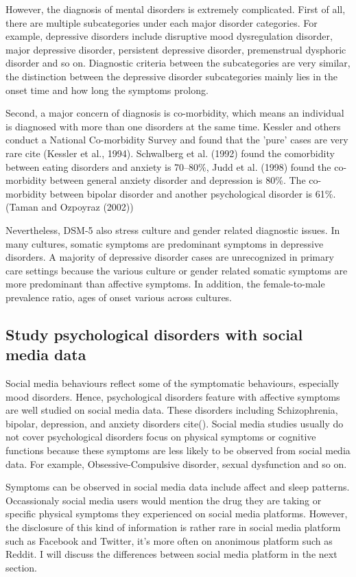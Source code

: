 However, the diagnosis of mental disorders is extremely complicated. First of all, there are multiple subcategories under each major disorder categories. For example, depressive disorders include disruptive mood dysregulation disorder, major depressive disorder, persistent depressive disorder, premenstrual dysphoric disorder and so on. Diagnostic criteria between the subcategories are very similar, the distinction between the depressive disorder subcategories mainly lies in the onset time and how long the symptoms prolong. 

Second, a major concern of diagnosis is co-morbidity, which means an individual is diagnosed with more than one disorders at the same time. Kessler and others conduct a National Co-morbidity Survey and found that the 'pure' cases are very rare cite (Kessler et al., 1994). Schwalberg et al. (1992) found the comorbidity between eating disorders and anxiety is 70–80\%, Judd et al. (1998) found the co-morbidity between general anxiety disorder and depression is 80\%. The co-morbidity between bipolar disorder and another psychological disorder is 61\%. (Taman and Ozpoyraz (2002))

Nevertheless, DSM-5 also stress culture and gender related diagnostic issues. In many cultures, somatic symptoms are predominant symptoms in depressive disorders. A majority of depressive disorder cases are unrecognized in primary care settings because the various culture or gender related somatic symptoms are more predominant than affective symptoms. In addition, the female-to-male prevalence ratio, ages of onset various across cultures. 


\subsection{Study psychological disorders with social media data}

Social media behaviours reflect some of the symptomatic behaviours, especially mood disorders. Hence, psychological disorders feature with affective symptoms are well studied on social media data. These disorders including Schizophrenia, bipolar, depression, and anxiety disorders cite(). Social media studies usually do not cover psychological disorders focus on physical symptoms or cognitive functions because these symptoms are less likely to be observed from social media data. For example, Obsessive-Compulsive disorder, sexual dysfunction and so on. 

Symptoms can be observed in social media data include affect and sleep patterns. Occassionaly social media users would mention the drug they are taking or specific physical symptoms they experienced on social media platforms. However, the disclosure of this kind of information is rather rare in social media platform such as Facebook and Twitter, it's more often on anonimous platform such as Reddit. I will discuss the differences between social media platform in the next section.





